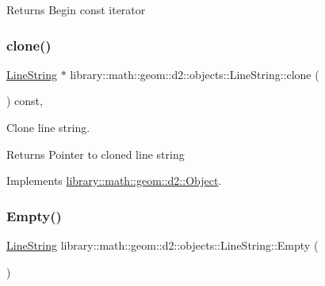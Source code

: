 \begin{DoxyReturn}{Returns}
Begin const iterator 
\end{DoxyReturn}
\mbox{\label{classlibrary_1_1math_1_1geom_1_1d2_1_1objects_1_1_line_string_a5b503802b279c6c305fed6a07a893ad2}} 
\subsubsection{\texorpdfstring{clone()}{clone()}}
{\footnotesize\ttfamily \hyperlink{classlibrary_1_1math_1_1geom_1_1d2_1_1objects_1_1_line_string}{Line\+String} $\ast$ library\+::math\+::geom\+::d2\+::objects\+::\+Line\+String\+::clone (\begin{DoxyParamCaption}{ }\end{DoxyParamCaption}) const\hspace{0.3cm}{\ttfamily [override]}, {\ttfamily [virtual]}}



Clone line string. 

\begin{DoxyReturn}{Returns}
Pointer to cloned line string 
\end{DoxyReturn}


Implements \hyperlink{classlibrary_1_1math_1_1geom_1_1d2_1_1_object_a5c26ae4120edb24f6463d65a9cef247d}{library\+::math\+::geom\+::d2\+::\+Object}.

\mbox{\label{classlibrary_1_1math_1_1geom_1_1d2_1_1objects_1_1_line_string_af8a783642dc4ba67d4e0ca2140cda343}} 
\subsubsection{\texorpdfstring{Empty()}{Empty()}}
{\footnotesize\ttfamily \hyperlink{classlibrary_1_1math_1_1geom_1_1d2_1_1objects_1_1_line_string}{Line\+String} library\+::math\+::geom\+::d2\+::objects\+::\+Line\+String\+::\+Empty (\begin{DoxyParamCaption}{ }\end{DoxyParamCaption})\hspace{0.3cm}{\ttfamily [static]}}



